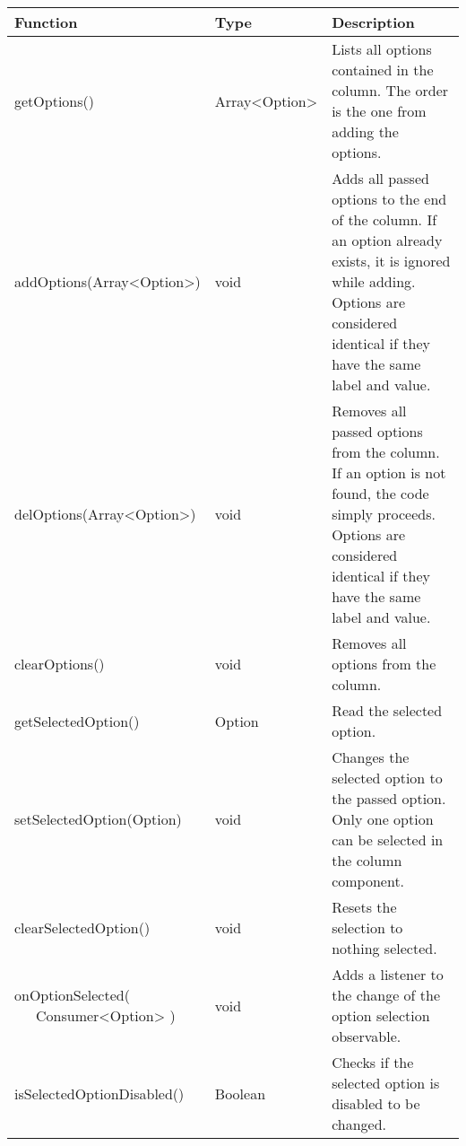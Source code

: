 \begin{table}[!htb] 
    \label{api:columnOptionsComponentReturn}
    \footnotesize
    \setlength\extrarowheight{4pt}
    \begin{tabular}{ p{5cm} p{3cm} p{4.5cm} }
        \toprule[1.2pt]
        \textbf{Function}                   & \textbf{Type}  & \textbf{Description} \\
        \midrule
        getOptions()                        & Array<Option>  & Lists all options contained in the column. 
                                                               The order is the one from adding the options. \\
        addOptions(Array<Option>)           & void           & Adds all passed options to the end of the column. 
                                                               If an option already exists, it is ignored while adding.
                                                               Options are considered identical if they have the same label and value. \\
        delOptions(Array<Option>)           & void           & Removes all passed options from the column.
                                                               If an option is not found, the code simply proceeds.
                                                               Options are considered identical if they have the same label and value. \\
        clearOptions()                      & void           & Removes all options from the column. \\
        getSelectedOption()                 & Option         & Read the selected option. \\
        setSelectedOption(Option)           & void           & Changes the selected option to the passed option. 
                                                               Only one option can be selected in the column component. \\
        clearSelectedOption()               & void           & Resets the selection to nothing selected. \\
        \tbbr{
            onOptionSelected( \\
                \ \ \ Consumer<Option>
            )}                              & void           & Adds a listener to the change of the option selection observable. \\
        isSelectedOptionDisabled()          & Boolean        & Checks if the selected option is disabled to be changed. \\

\end{tabular}
\end{table}
